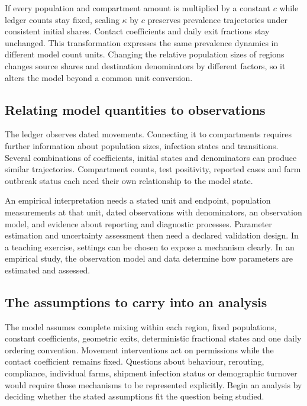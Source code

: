 \documentclass[11pt,a4paper]{article}
\begin{document}
If every population and compartment amount is multiplied by a constant
\(c\) while ledger counts stay fixed, scaling \(\kappa \) by \(c\)
preserves prevalence trajectories under consistent initial shares.
Contact coefficients and daily exit fractions stay unchanged. This
transformation expresses the same prevalence dynamics in different model
count units. Changing the relative population sizes of regions changes
source shares and destination denominators by different factors, so it
alters the model beyond a common unit conversion.

\subsection{Relating model quantities to
observations}\label{relating-model-quantities-to-observations}

The ledger observes dated movements. Connecting it to compartments
requires further information about population sizes, infection states
and transitions. Several combinations of coefficients, initial states
and denominators can produce similar trajectories. Compartment counts,
test positivity, reported cases and farm outbreak status each need their
own relationship to the model state.

An empirical interpretation needs a stated unit and endpoint, population
measurements at that unit, dated observations with denominators, an
observation model, and evidence about reporting and diagnostic
processes. Parameter estimation and uncertainty assessment then need a
declared validation design. In a teaching exercise, settings can be
chosen to expose a mechanism clearly. In an empirical study, the
observation model and data determine how parameters are estimated and
assessed.

\subsection{The assumptions to carry into an
analysis}\label{the-assumptions-to-carry-into-an-analysis}

The model assumes complete mixing within each region, fixed populations,
constant coefficients, geometric exits, deterministic fractional states
and one daily ordering convention. Movement interventions act on
permissions while the contact coefficient remains fixed. Questions about
behaviour, rerouting, compliance, individual farms, shipment infection
status or demographic turnover would require those mechanisms to be
represented explicitly. Begin an analysis by deciding whether the stated
assumptions fit the question being studied.
\end{document}
